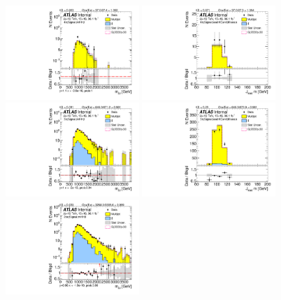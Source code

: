 \begin{figure}[htbp!]
\begin{center}
\includegraphics[width=0.45\textwidth,angle=-90]{figures/boosted/ZZ/Moriond_ZZ_FourTag_Signal_mHH_l_1.pdf}
\includegraphics[width=0.45\textwidth,angle=-90]{figures/boosted/ZZ/Moriond_ZZ_FourTag_Signal_leadHCand_Mass_s.pdf}\\
\includegraphics[width=0.45\textwidth,angle=-90]{figures/boosted/ZZ/Moriond_ZZ_ThreeTag_Signal_mHH_l_1.pdf}
\includegraphics[width=0.45\textwidth,angle=-90]{figures/boosted/ZZ/Moriond_ZZ_ThreeTag_Signal_leadHCand_Mass_s.pdf}\\
\includegraphics[width=0.45\textwidth,angle=-90]{figures/boosted/ZZ/Moriond_ZZ_TwoTag_split_Signal_mHH_l_1.pdf}

\end{center}
\end{figure}
